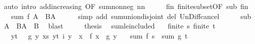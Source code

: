 \begin{isabellebody}
\ {\isacharparenleft}{\kern0pt}auto\ intro{\isacharcolon}{\kern0pt}\ add{\isacharunderscore}{\kern0pt}increasing{}\ {\isacharbrackleft}{\kern0pt}OF\ sum{\isacharunderscore}{\kern0pt}nonneg{\isacharbrackright}{\kern0pt}\ nn{\isacharparenright}{\kern0pt}\isanewline
\ \ \isamarkupfalse%
\ \isamarkupfalse%
\ fin\ finite{\isacharunderscore}{\kern0pt}subset{\isacharbrackleft}{\kern0pt}OF\ sub\ fin{\isacharbrackright}{\kern0pt}\ \isamarkupfalse%
\ {\isachardoublequoteopen}{\isasymdots}\ {\isacharequal}{\kern0pt}\ sum\ f\ {\isacharparenleft}{\kern0pt}A\ {\isasymunion}\ {\isacharparenleft}{\kern0pt}B{\isacharminus}{\kern0pt}A{\isacharparenright}{\kern0pt}{\isacharparenright}{\kern0pt}{\isachardoublequoteclose}\isanewline
\ \ \ \ \isamarkupfalse%
\ {\isacharparenleft}{\kern0pt}simp\ add{\isacharcolon}{\kern0pt}\ sum{\isachardot}{\kern0pt}union{\isacharunderscore}{\kern0pt}disjoint\ del{\isacharcolon}{\kern0pt}\ Un{\isacharunderscore}{\kern0pt}Diff{\isacharunderscore}{\kern0pt}cancel{\isacharparenright}{\kern0pt}\isanewline
\ \ \isamarkupfalse%
\ \isamarkupfalse%
\ sub\ \isamarkupfalse%
\ {\isachardoublequoteopen}A\ {\isasymunion}\ {\isacharparenleft}{\kern0pt}B{\isacharminus}{\kern0pt}A{\isacharparenright}{\kern0pt}\ {\isacharequal}{\kern0pt}\ B{\isachardoublequoteclose}\ \isamarkupfalse%
\ blast\isanewline
\ \ \isamarkupfalse%
\ \isamarkupfalse%
\ {\isacharquery}{\kern0pt}thesis\ \isacommand{{\isachardot}{\kern0pt}}\isamarkupfalse%
\isanewline
{}\isamarkupfalse%
%
\endisatagproof
{\isafoldproof}%
%
\isadelimproof
\isanewline
%
\endisadelimproof
\isanewline
{}\isamarkupfalse%
\ sum{\isacharunderscore}{\kern0pt}le{\isacharunderscore}{\kern0pt}included{\isacharcolon}{\kern0pt}\isanewline
\ \ \ {\isachardoublequoteopen}finite\ s{\isachardoublequoteclose}\ {\isachardoublequoteopen}finite\ t{\isachardoublequoteclose}\isanewline
\ \ \ {\isachardoublequoteopen}{\isasymforall}y{\isasymin}t{\isachardot}{\kern0pt}\ {}\ {\isasymle}\ g\ y{\isachardoublequoteclose}\ {\isachardoublequoteopen}{\isacharparenleft}{\kern0pt}{\isasymforall}x{\isasymin}s{\isachardot}{\kern0pt}\ {\isasymexists}y{\isasymin}t{\isachardot}{\kern0pt}\ i\ y\ {\isacharequal}{\kern0pt}\ x\ {\isasymand}\ f\ x\ {\isasymle}\ g\ y{\isacharparenright}{\kern0pt}{\isachardoublequoteclose}\isanewline
\ \ \ {\isachardoublequoteopen}sum\ f\ s\ {\isasymle}\ sum\ g\ t{\isachardoublequoteclose}\isanewline

\end{isabellebody}
